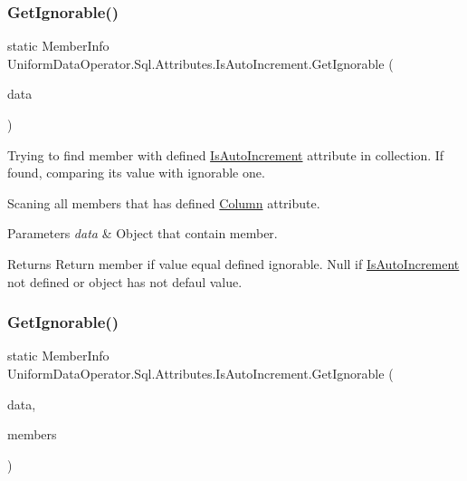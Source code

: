 \subsubsection{\texorpdfstring{Get\+Ignorable()}{GetIgnorable()}\hspace{0.1cm}{\footnotesize\ttfamily [1/2]}}
{\footnotesize\ttfamily static Member\+Info Uniform\+Data\+Operator.\+Sql.\+Attributes.\+Is\+Auto\+Increment.\+Get\+Ignorable (\begin{DoxyParamCaption}\item[{ref object}]{data }\end{DoxyParamCaption})\hspace{0.3cm}{\ttfamily [static]}}



Trying to find member with defined \mbox{\hyperlink{class_uniform_data_operator_1_1_sql_1_1_attributes_1_1_is_auto_increment}{Is\+Auto\+Increment}} attribute in collection. If found, comparing it\textquotesingle{}s value with ignorable one. 

Scaning all members that has defined \mbox{\hyperlink{class_uniform_data_operator_1_1_sql_1_1_attributes_1_1_column}{Column}} attribute. 


\begin{DoxyParams}{Parameters}
{\em data} & Object that contain member.\\
\hline
\end{DoxyParams}
\begin{DoxyReturn}{Returns}
Return member if value equal defined ignorable. Null if \mbox{\hyperlink{class_uniform_data_operator_1_1_sql_1_1_attributes_1_1_is_auto_increment}{Is\+Auto\+Increment}} not defined or object has not defaul value.
\end{DoxyReturn}
\mbox{\label{class_uniform_data_operator_1_1_sql_1_1_attributes_1_1_is_auto_increment_ac662ab14322c8114855cb22e5395ab56}} 
\subsubsection{\texorpdfstring{Get\+Ignorable()}{GetIgnorable()}\hspace{0.1cm}{\footnotesize\ttfamily [2/2]}}
{\footnotesize\ttfamily static Member\+Info Uniform\+Data\+Operator.\+Sql.\+Attributes.\+Is\+Auto\+Increment.\+Get\+Ignorable (\begin{DoxyParamCaption}\item[{ref object}]{data,  }\item[{I\+Enumerable$<$ Member\+Info $>$}]{members }\end{DoxyParamCaption})\hspace{0.3cm}{\ttfamily [static]}}



